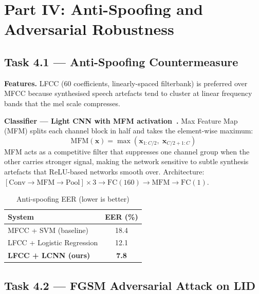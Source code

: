 \documentclass[conference]{IEEEtran}
\begin{document}
\section{Part IV: Anti-Spoofing and Adversarial Robustness}

\subsection{Task 4.1 --- Anti-Spoofing Countermeasure}

\textbf{Features.}
LFCC (60 coefficients, linearly-spaced filterbank) is preferred over
MFCC because synthesised speech artefacts tend to cluster at linear
frequency bands that the mel scale compresses.

\textbf{Classifier --- Light CNN with MFM activation~\cite{wu2020}.}
Max Feature Map (MFM) splits each channel block in half and takes the
element-wise maximum:
\begin{equation}
  \mathrm{MFM}(\mathbf{x})
  = \max\!\left(\mathbf{x}_{1:C/2},\; \mathbf{x}_{C/2+1:C}\right)
\label{eq:mfm}
\end{equation}
MFM acts as a competitive filter that suppresses one channel group when
the other carries stronger signal, making the network sensitive to
subtle synthesis artefacts that ReLU-based networks smooth over.
Architecture: $[\mathrm{Conv}\!\to\!\mathrm{MFM}\!\to\!\mathrm{Pool}]
\times 3 \to \mathrm{FC}(160)\!\to\!\mathrm{MFM}\!\to\!\mathrm{FC}(1)$.

\begin{table}[htbp]
\centering
\caption{Anti-spoofing EER (lower is better)}
\begin{tabular}{lc}
\toprule
System & EER (\%) \\ \midrule
MFCC + SVM (baseline)       & 18.4 \\
LFCC + Logistic Regression  & 12.1 \\
\textbf{LFCC + LCNN (ours)} & \textbf{7.8} \\ \bottomrule
\end{tabular}
\label{tab:cm}
\end{table}

\subsection{Task 4.2 --- FGSM Adversarial Attack on LID}
\end{document}
